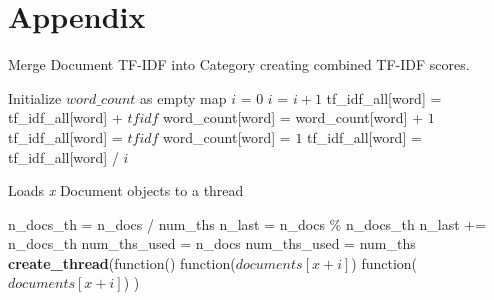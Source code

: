 \documentclass[conference]{IEEEtran}
\begin{document}
\section*{Appendix}

\begin{algorithm}
    \caption{Merge Document TF-IDF into Category creating combined TF-IDF scores.}
    \begin{algorithmic}[1]
    \State Initialize $word\_count$ as empty map
    \State $i$ = $0$
        \State $i$ = $i + 1$
            \State tf\_idf\_all[word] = tf\_idf\_all[word] + $tfidf$
            \State word\_count[word] = word\_count[word] + $1$
        \Else
            \State tf\_idf\_all[word] = $tfidf$
            \State word\_count[word] = $1$
        \EndIf
    \EndFor
        \State tf\_idf\_all[word] = tf\_idf\_all[word] / $i$
    \EndFor
    \end{algorithmic}
\end{algorithm}

\begin{algorithm}
    \caption{Loads \textit{x} Document objects to a thread}
    \begin{algorithmic}[1]
    \State n\_docs\_th = n\_docs / num\_ths
    \State n\_last = n\_docs \% n\_docs\_th
    \State n\_last += n\_docs\_th
        \State num\_ths\_used = n\_docs
    \Else
        \State num\_ths\_used = num\_ths
    \EndIf
        \State \textbf{create\_thread}(function()
                    \State function($documents[x + i]$)
                \EndIf
            \EndFor
        \Else
                    \State function($documents[x + i]$)
                \EndIf
            \EndFor
        \EndIf
        \State ) 
    \EndFor
    \end{algorithmic}
\end{algorithm}

    
\end{document}
